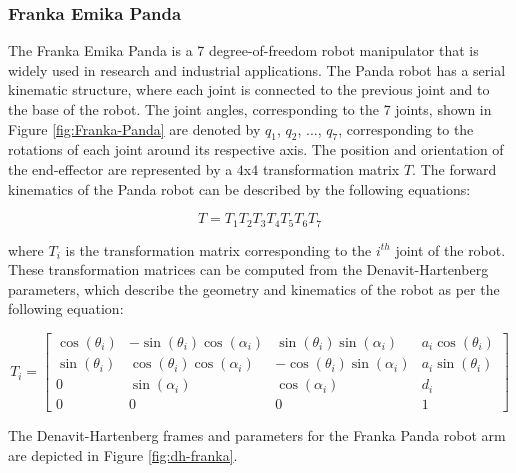 \subsubsection{Franka Emika Panda}

The Franka Emika Panda is a 7 degree-of-freedom robot manipulator that is widely used in research and industrial applications. The Panda robot has a serial kinematic structure, where each joint is connected to the previous joint and to the base of the robot. The joint angles, corresponding to the 7 joints, shown in Figure \ref{fig:Franka-Panda} are denoted by $q_1$, $q_2$, ..., $q_7$, corresponding to the rotations of each joint around its respective axis. The position and orientation of the end-effector are represented by a $4$x$4$ transformation matrix $T$. The forward kinematics of the Panda robot can be described by the following equations:

\begin{equation}
    T = T_1T_2T_3T_4T_5T_6T_7
    \label{eqn: fk_manipulator}
\end{equation}


where $T_i$ is the transformation matrix corresponding to the $i^{th}$ joint of the robot. These transformation matrices can be computed from the Denavit-Hartenberg parameters, which describe the geometry and kinematics of the robot as per the following equation:

\begin{equation}
    T_i = \begin{bmatrix}
    \cos(\theta_i) & -\sin(\theta_i)\cos(\alpha_i) & \sin(\theta_i)\sin(\alpha_i) & a_i\cos(\theta_i)\\
    \sin(\theta_i) & \cos(\theta_i)\cos(\alpha_i) & 
    -\cos(\theta_i)\sin(\alpha_i) & a_i\sin(\theta_i)\\
    0 & \sin(\alpha_i) & \cos(\alpha_i) & d_i \\
    0 & 0 & 0 & 1
    \end{bmatrix}
\end{equation}



The Denavit-Hartenberg frames and parameters for the Franka Panda robot arm are depicted in Figure \ref{fig:dh-franka}.

